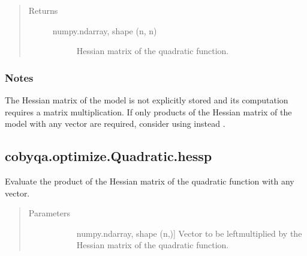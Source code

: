 \documentclass[letterpaper,10pt,english]{sphinxmanual}
\begin{document}
\begin{fulllineitems}
\begin{fulllineitems}
\begin{quote}
\begin{description}
\begin{description}
\end{description}

\item[{Returns}] \leavevmode\begin{description}
\item[{numpy.ndarray, shape (n, n)}] \leavevmode
\sphinxAtStartPar
Hessian matrix of the quadratic function.

\end{description}

\end{description}\end{quote}
\subsubsection*{Notes}

\sphinxAtStartPar
The Hessian matrix of the model is not explicitly stored and its
computation requires a matrix multiplication. If only products of the
Hessian matrix of the model with any vector are required, consider using
instead {\hyperref[\detokenize{refs/generated/cobyqa.optimize.Quadratic.hessp:cobyqa.optimize.Quadratic.hessp}]{}}.

\end{fulllineitems}



\subsection{cobyqa.optimize.Quadratic.hessp}
\label{\detokenize{refs/generated/cobyqa.optimize.Quadratic.hessp:cobyqa-optimize-quadratic-hessp}}\label{\detokenize{refs/generated/cobyqa.optimize.Quadratic.hessp::doc}}

\begin{fulllineitems}
\label{\detokenize{refs/generated/cobyqa.optimize.Quadratic.hessp:cobyqa.optimize.Quadratic.hessp}}
\sphinxAtStartPar
Evaluate the product of the Hessian matrix of the quadratic function
with any vector.
\begin{quote}\begin{description}
\item[{Parameters}] \leavevmode\begin{description}
\item[{}] \leavevmode{[}numpy.ndarray, shape (n,){]}
\sphinxAtStartPar
Vector to be left\sphinxhyphen{}multiplied by the Hessian matrix of the quadratic
function.


\end{description}
\end{description}
\end{quote}
\end{fulllineitems}
\end{fulllineitems}
\end{document}
